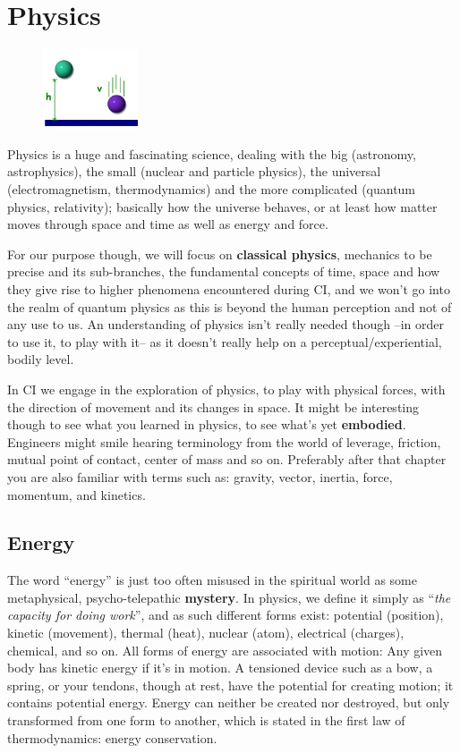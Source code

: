 \section{Physics}\label{sec:physics}

\begin{figure}
    \centering
    \includegraphics[width=0.25\textwidth]{images/physics}
\end{figure}

Physics is a huge and fascinating science, dealing with the big (astronomy, astrophysics), the small (nuclear and particle physics), the universal (electromagnetism, thermodynamics) and the more complicated (quantum physics, relativity); basically how the universe behaves, or at least how matter moves through space and time as well as energy and force.

For our purpose though, we will focus on \textbf{classical physics}, mechanics to be precise and its sub-branches, the fundamental concepts of time, space and how they give rise to higher phenomena encountered during CI, and we won't go into the realm of quantum physics as this is beyond the human perception and not of any use to us.
An understanding of physics isn't really needed though --in order to use it, to play with it-- as it doesn't really help on a perceptual/experiential, bodily level.

In CI we engage in the exploration of physics, to play with physical forces, with the direction of movement and its changes in space.
It might be interesting though to see what you learned in physics, to see what's yet \textbf{embodied}.
Engineers might smile hearing terminology from the world of leverage, friction, mutual point of contact, center of mass and so on.
Preferably after that chapter you are also familiar with terms such as: gravity, vector, inertia, force, momentum, and kinetics.

\subsection{Energy}\label{subsec:energy}

The word ``energy'' is just too often misused in the spiritual world as some metaphysical, psycho-telepathic \textbf{mystery}.
In physics, we define it simply as ``\textit{the capacity for doing work}'', and as such different forms exist: potential (position), kinetic (movement), thermal (heat), nuclear (atom), electrical (charges), chemical, and so on.
All forms of energy are associated with motion: Any given body has kinetic energy if it's in motion.
A tensioned device such as a bow, a spring, or your tendons, though at rest, have the potential for creating motion; it contains potential energy.
Energy can neither be created nor destroyed, but only transformed from one form to another, which is stated in the first law of thermodynamics: energy conservation.


